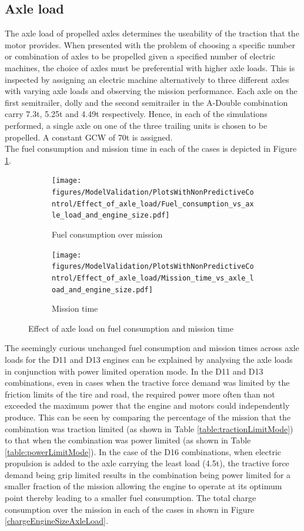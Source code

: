 \documentclass[ExampleMasters.tex]{subfiles}
\begin{document}
\subsection{Axle load}
The axle load of propelled axles determines the useability of the traction that the motor provides. When presented with the problem of choosing a specific number or combination of axles to be propelled given a specified number of electric machines, the choice of axles must be preferential with higher axle loads. This is inspected by assigning an electric machine alternatively to three different axles with varying axle loads and observing the mission performance. Each axle on the first semitrailer, dolly and the second semitrailer in the A-Double combination carry 7.3t, 5.25t and 4.49t respectively. Hence, in each of the simulations performed, a single axle on one of the three trailing units is chosen to be propelled. A constant GCW of 70t is assigned.\\
The fuel consumption and mission time in each of the cases is depicted in Figure \ref{fuelTimeEngineAxleLoad}.
\begin{figure}[h!]
\begin{subfigure}{.5\textwidth}
\centering
\texttt{[image: figures/ModelValidation/PlotsWithNonPredictiveControl/Effect\_of\_axle\_load/Fuel\_consumption\_vs\_axle\_load\_and\_engine\_size.pdf]}
\caption{Fuel consumption over mission}
\end{subfigure}
\begin{subfigure}{.5\textwidth}
\centering
\texttt{[image: figures/ModelValidation/PlotsWithNonPredictiveControl/Effect\_of\_axle\_load/Mission\_time\_vs\_axle\_load\_and\_engine\_size.pdf]}
\caption{Mission time}
\end{subfigure}
\caption{Effect of axle load on fuel consumption and mission time}
\label{fuelTimeEngineAxleLoad}
\end{figure}
The seemingly curious unchanged fuel consumption and mission times across axle loads for the D11 and D13 engines can be explained by analysing the axle loads in conjunction with power limited operation mode. In the D11 and D13 combinations, even in cases when the tractive force demand was limited by the friction limits of the tire and road, the required power more often than not exceeded the maximum power that the engine and motors could independently produce. This can be seen by comparing the percentage of the mission that the combination was traction limited (as shown in Table \ref{table:tractionLimitMode}) to that when the combination was power limited (as shown in Table \ref{table:powerLimitMode}). In the case of the D16 combinations, when electric propulsion is added to the axle carrying the least load (4.5t), the tractive force demand being grip limited results in the combination being power limited for a smaller fraction of the mission allowing the engine to operate at its optimum point thereby leading to a smaller fuel consumption. The total charge consumption over the mission in each of the cases in shown in Figure \ref{chargeEngineSizeAxleLoad}.\\
\end{document}
